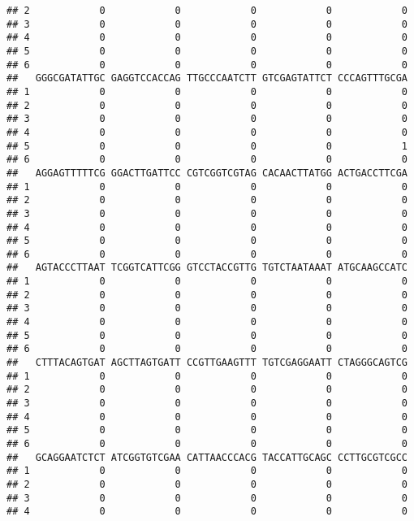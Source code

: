 \documentclass[]{article}
\begin{document}
\begin{verbatim}
## 2            0            0            0            0            0
## 3            0            0            0            0            0
## 4            0            0            0            0            0
## 5            0            0            0            0            0
## 6            0            0            0            0            0
##   GGGCGATATTGC GAGGTCCACCAG TTGCCCAATCTT GTCGAGTATTCT CCCAGTTTGCGA
## 1            0            0            0            0            0
## 2            0            0            0            0            0
## 3            0            0            0            0            0
## 4            0            0            0            0            0
## 5            0            0            0            0            1
## 6            0            0            0            0            0
##   AGGAGTTTTTCG GGACTTGATTCC CGTCGGTCGTAG CACAACTTATGG ACTGACCTTCGA
## 1            0            0            0            0            0
## 2            0            0            0            0            0
## 3            0            0            0            0            0
## 4            0            0            0            0            0
## 5            0            0            0            0            0
## 6            0            0            0            0            0
##   AGTACCCTTAAT TCGGTCATTCGG GTCCTACCGTTG TGTCTAATAAAT ATGCAAGCCATC
## 1            0            0            0            0            0
## 2            0            0            0            0            0
## 3            0            0            0            0            0
## 4            0            0            0            0            0
## 5            0            0            0            0            0
## 6            0            0            0            0            0
##   CTTTACAGTGAT AGCTTAGTGATT CCGTTGAAGTTT TGTCGAGGAATT CTAGGGCAGTCG
## 1            0            0            0            0            0
## 2            0            0            0            0            0
## 3            0            0            0            0            0
## 4            0            0            0            0            0
## 5            0            0            0            0            0
## 6            0            0            0            0            0
##   GCAGGAATCTCT ATCGGTGTCGAA CATTAACCCACG TACCATTGCAGC CCTTGCGTCGCC
## 1            0            0            0            0            0
## 2            0            0            0            0            0
## 3            0            0            0            0            0
## 4            0            0            0            0            0

\end{verbatim}
\end{document}
